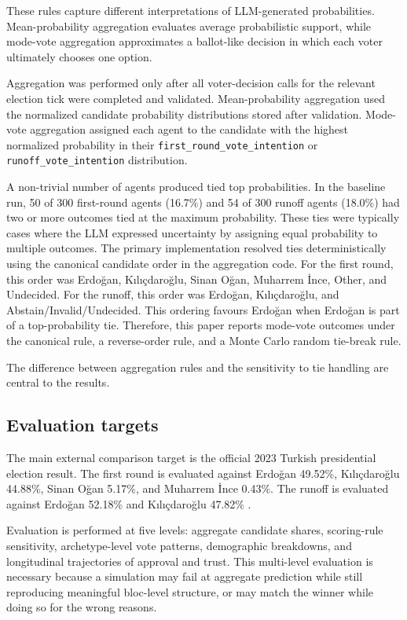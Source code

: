\documentclass[pdflatex,sn-mathphys-num,iicol]{sn-jnl}
\begin{document}
These rules capture different interpretations of LLM-generated probabilities. Mean-probability aggregation evaluates average probabilistic support, while mode-vote aggregation approximates a ballot-like decision in which each voter ultimately chooses one option.

Aggregation was performed only after all voter-decision calls for the relevant election tick were completed and validated. Mean-probability aggregation used the normalized candidate probability distributions stored after validation. Mode-vote aggregation assigned each agent to the candidate with the highest normalized probability in their \texttt{first\_round\_vote\_intention} or \texttt{runoff\_vote\_intention} distribution.

A non-trivial number of agents produced tied top probabilities. In the baseline run, 50 of 300 first-round agents (16.7\%) and 54 of 300 runoff agents (18.0\%) had two or more outcomes tied at the maximum probability. These ties were typically cases where the LLM expressed uncertainty by assigning equal probability to multiple outcomes. The primary implementation resolved ties deterministically using the canonical candidate order in the aggregation code. For the first round, this order was Erdoğan, Kılıçdaroğlu, Sinan Oğan, Muharrem İnce, Other, and Undecided. For the runoff, this order was Erdoğan, Kılıçdaroğlu, and Abstain/Invalid/Undecided. This ordering favours Erdoğan when Erdoğan is part of a top-probability tie. Therefore, this paper reports mode-vote outcomes under the canonical rule, a reverse-order rule, and a Monte Carlo random tie-break rule.

The difference between aggregation rules and the sensitivity to tie handling are central to the results.

\subsection{Evaluation targets}\label{subsec:evaluation}

The main external comparison target is the official 2023 Turkish presidential election result. The first round is evaluated against Erdoğan 49.52\%, Kılıçdaroğlu 44.88\%, Sinan Oğan 5.17\%, and Muharrem İnce 0.43\%. The runoff is evaluated against Erdoğan 52.18\% and Kılıçdaroğlu 47.82\% \cite{ysk2023}.

Evaluation is performed at five levels: aggregate candidate shares, scoring-rule sensitivity, archetype-level vote patterns, demographic breakdowns, and longitudinal trajectories of approval and trust. This multi-level evaluation is necessary because a simulation may fail at aggregate prediction while still reproducing meaningful bloc-level structure, or may match the winner while doing so for the wrong reasons.
\end{document}
